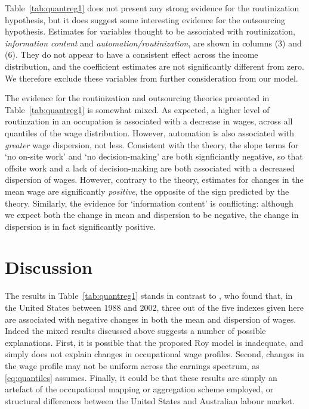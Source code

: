 Table~\ref{tab:quantreg1} does not present any strong evidence for the routinization hypothesis, but it does suggest some interesting evidence for the outsourcing hypothesis. Estimates for variables thought to be associated with routinization, {\em information content} and {\em automation/routinization}, are shown in columns (3) and (6). They do not appear to have a consistent effect across the income distribution, and the coefficient estimates are not significantly different from zero. We therefore exclude these variables from further consideration from our model.

The evidence for the routinization and outsourcing theories presented in Table~\ref{tab:quantreg1} is somewhat mixed. As expected, a higher level of routinzation in an occupation is associated with a decrease in wages, across all quantiles of the wage distribution. However, automation is also associated with {\em greater} wage dispersion, not less. Consistent with the theory, the slope terms for `no on-site work' and `no decision-making' are both signficiantly negative, so that offsite work and a lack of decision-making are both associated with a decreased dispersion of wages. However, contrary to the theory, estimates for changes in the mean wage are significantly {\em positive}, the opposite of the sign predicted by the theory. Similarly, the evidence for `information content' is conflicting: although we expect both the change in mean and dispersion to be negative, the change in dispersion is in fact significantly positive.

\section{Discussion}

The results in Table~\ref{tab:quantreg1} stands in contrast to \citet{Firpo2011}, who found that, in the United States between 1988 and 2002, three out of the five indexes given here are associated with negative changes in both the mean and dispersion of wages. Indeed the mixed results discussed above suggests a number of possible explanations. First, it is possible that the proposed Roy model is inadequate, and simply does not explain changes in occupational wage profiles. Second, changes in the wage profile may not be uniform across the earnings spectrum, as \eqref{eq:quantiles} assumes. Finally, it could be that these results are simply an artefact of the occupational mapping or aggregation scheme employed, or structural differences between the United States and Australian labour market.

